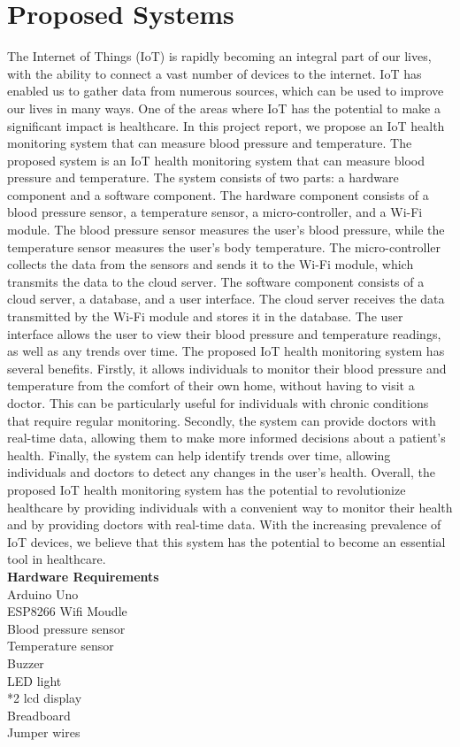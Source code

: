 \documentclass[conference]{IEEEtran}
\begin{document}
    \section{Proposed Systems}
    The Internet of Things (IoT) is rapidly becoming an integral part of our lives, with the ability to connect a vast number of devices to the internet. IoT has enabled us to gather data from numerous sources, which can be used to improve our lives in many ways. One of the areas where IoT has the potential to make a significant impact is healthcare. In this project report, we propose an IoT health monitoring system that can measure blood pressure and temperature.
The proposed system is an IoT health monitoring system that can measure blood pressure and temperature. The system consists of two parts: a hardware component and a software component.
The hardware component consists of a blood pressure sensor, a temperature sensor, a micro-controller, and a Wi-Fi module. The blood pressure sensor measures the user's blood pressure, while the temperature sensor measures the user's body temperature. The micro-controller collects the data from the sensors and sends it to the Wi-Fi module, which transmits the data to the cloud server.
The software component consists of a cloud server, a database, and a user interface. The cloud server receives the data transmitted by the Wi-Fi module and stores it in the database. The user interface allows the user to view their blood pressure and temperature readings, as well as any trends over time.
The proposed IoT health monitoring system has several benefits. Firstly, it allows individuals to monitor their blood pressure and temperature from the comfort of their own home, without having to visit a doctor. This can be particularly useful for individuals with chronic conditions that require regular monitoring. Secondly, the system can provide doctors with real-time data, allowing them to make more informed decisions about a patient's health. Finally, the system can help identify trends over time, allowing individuals and doctors to detect any changes in the user's health.
Overall, the proposed IoT health monitoring system has the potential to revolutionize healthcare by providing individuals with a convenient way to monitor their health and by providing doctors with real-time data. With the increasing prevalence of IoT devices, we believe that this system has the potential to become an essential tool in healthcare.\\
\newline
\textbf{Hardware Requirements}\\
\textbullet Arduino Uno\\
\textbullet ESP8266 Wifi Moudle\\
\textbullet Blood pressure sensor\\
\textbullet Temperature sensor\\
\textbullet Buzzer \\
\textbullet LED light\\
*2 lcd display\\
\textbullet Breadboard\\
\textbullet Jumper wires\\
\end{document}

